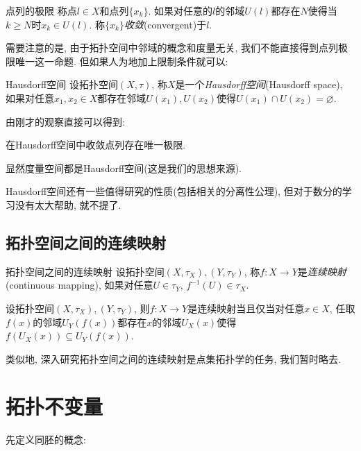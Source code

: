 \begin{definition}{点列的极限}
	称点$l \in X$和点列$\{ x_k \}$. 如果对任意的$l$的邻域$U(l)$都存在$N$使得当$k \geq N$时$x_k \in U(l)$. 称$\{ x_k \}$\textit{收敛}(convergent)于$l$. 
\end{definition}

需要注意的是, 由于拓扑空间中邻域的概念和度量无关, 我们不能直接得到点列极限唯一这一命题. 但如果人为地加上限制条件就可以: 

\begin{axiom}{Hausdorff空间}
	设拓扑空间$(X,\tau)$, 称$X$是一个\textit{Hausdorff空间}(Hausdorff space), 如果对任意$x_1,x_2 \in X$都存在邻域$U(x_1),U(x_2)$使得$U(x_1) \cap U(x_2) = \varnothing$. 
\end{axiom}

由刚才的观察直接可以得到: 

\begin{proposition}{}
	在Hausdorff空间中收敛点列存在唯一极限. 
\end{proposition}

显然度量空间都是Hausdorff空间(这是我们的思想来源). 

Hausdorff空间还有一些值得研究的性质(包括相关的分离性公理), 但对于数分的学习没有太大帮助, 就不提了. 

\subsection{拓扑空间之间的连续映射}

\begin{definition}{拓扑空间之间的连续映射}
	设拓扑空间$(X,\tau _X),(Y,\tau _Y)$, 称$f: X \to Y$是\textit{连续映射}(continuous mapping), 如果对任意$U \in \tau _Y$, $f^{-1}(U) \in \tau _X$. 
\end{definition}

\begin{proposition}{}
	设拓扑空间$(X,\tau _X),(Y,\tau _Y)$, 则$f:X \to Y$是连续映射当且仅当对任意$x \in X$, 任取$f(x)$的邻域$U_Y(f(x))$都存在$x$的邻域$U_X(x)$使得$f(U_X(x)) \subseteq U_Y(f(x))$. 
\end{proposition}

类似地, 深入研究拓扑空间之间的连续映射是点集拓扑学的任务, 我们暂时略去. 


\newpage
\section{拓扑不变量}

先定义同胚的概念: 

